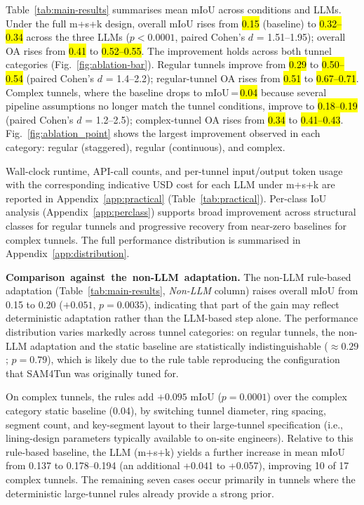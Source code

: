 \documentclass[a4paper,fleqn]{cas-dc}
\begin{document}
{Table~\ref{tab:main-results} summarises mean mIoU across conditions and LLMs. Under the full m+s+k design, overall mIoU rises from \hl{0.15} (baseline) to \hl{0.32--0.34} across the three LLMs ($p < 0.0001$, paired Cohen's \mbox{$d$} = 1.51--1.95); overall OA rises from \hl{0.41} to \hl{0.52--0.55}. The improvement holds across both tunnel categories (Fig.~\ref{fig:ablation-bar}). Regular tunnels improve from \hl{0.29} to \hl{0.50--0.54} (paired Cohen's \mbox{$d$} = 1.4--2.2); regular-tunnel OA rises from \hl{0.51} to \hl{0.67--0.71}. Complex tunnels, where the baseline drops to mIoU\,=\,\hl{0.04} because several pipeline assumptions no longer match the tunnel conditions, improve to \hl{0.18--0.19} (paired Cohen's \mbox{$d$} = 1.2--2.5); complex-tunnel OA rises from \hl{0.34} to \hl{0.41--0.43}. Fig.~\ref{fig:ablation_point} shows the largest improvement observed in each category: regular (staggered), regular (continuous), and complex.

Wall-clock runtime, API-call counts, and per-tunnel input/output token usage with the corresponding indicative USD cost for each LLM under m+s+k are reported in Appendix~\ref{app:practical} (Table~\ref{tab:practical}). Per-class IoU analysis (Appendix~\ref{app:perclass}) supports broad improvement across structural classes for regular tunnels and progressive recovery from near-zero baselines for complex tunnels. The full performance distribution is summarised in Appendix~\ref{app:distribution}. 



\mbox{\textbf{Comparison against the non-LLM adaptation.}} The non-LLM rule-based adaptation (Table~\mbox{\ref{tab:main-results}}, \mbox{\emph{Non-LLM}} column) raises overall mIoU from 0.15 to 0.20 ($+0.051$, $p = 0.0035$), indicating that part of the gain may reflect deterministic adaptation rather than the LLM-based step alone. The performance distribution varies markedly across tunnel categories: on regular tunnels, the non-LLM adaptation and the static baseline are statistically indistinguishable ($\approx 0.29$; $p = 0.79$), which is likely due to the rule table reproducing the configuration that SAM4Tun was originally tuned for.

On complex tunnels, the rules add $+0.095$ mIoU ($p = 0.0001$) over the complex category static baseline (0.04), by switching tunnel diameter, ring spacing, segment count, and key-segment layout to their large-tunnel specification (i.e., lining-design parameters typically available to on-site engineers). Relative to this rule-based baseline, the LLM (m+s+k) yields a further increase in mean mIoU from 0.137 to 0.178--0.194 (an additional +0.041 to +0.057), improving 10 of 17 complex tunnels. The remaining seven cases occur primarily in tunnels where the deterministic large-tunnel rules already provide a strong prior.

}
\end{document}

